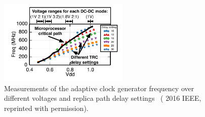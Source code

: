 \documentclass[graybox]{svmult}
\begin{document}

\begin{figure}
  \centering
  \includegraphics[width=0.55\textwidth]{6-raven3-clock}
  \caption{Measurements of the adaptive clock generator frequency over different voltages and replica path delay settings~\cite{Zimmer2016} ({\textcopyright} 2016 IEEE, reprinted with permission). }
  \label{fig:6-raven3-clock}
\end{figure}
\end{document}
